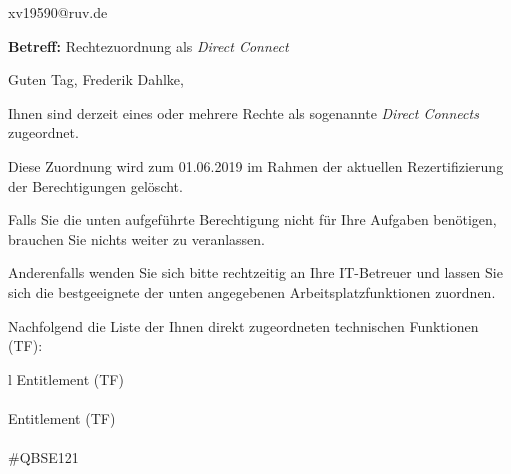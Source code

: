 \documentclass[a4paper,landscape,12pt]{letter}
\begin{document}
\begin{letter}{xv19590@ruv.de\hfill \break}
\begin{normalsize}
	\opening{\textbf{Betreff:} Rechtezuordnung als \emph{Direct Connect}}
	\begin{normalsize} \hfill
	\end{normalsize}

	\begin{normalsize}
		Guten Tag, 
	Frederik Dahlke, \hfill \break
	\end{normalsize}
	\end{normalsize}
	
\begin{normalsize}
	Ihnen sind derzeit eines oder mehrere Rechte als sogenannte \emph{Direct Connects} zugeordnet.
	
	Diese Zuordnung wird zum 01.06.2019 im Rahmen der aktuellen Rezertifizierung der Berechtigungen gelöscht.
	
	Falls Sie die unten aufgeführte Berechtigung nicht für Ihre Aufgaben benötigen, 
	brauchen Sie nichts weiter zu veranlassen.
	
	Anderenfalls wenden Sie sich bitte rechtzeitig an Ihre IT-Betreuer 
	und lassen Sie sich die bestgeeignete der unten angegebenen Arbeitsplatzfunktionen zuordnen.
	\end{normalsize}
	
\begin{normalsize}
	Nachfolgend die Liste der Ihnen direkt zugeordneten technischen Funktionen (TF):

	\begin{longtable}{l}
		Entitlement (TF) \\ \hline
		\endfirsthead
		\\\hline
		Entitlement (TF) \\ \hline
		\endhead %
		\multicolumn{1}{r@{}}{Fortsetzung \ldots}\\
		\endfoot
		\hline
		\endlastfoot
	\#QBSE121\\
	\end{longtable}
	\end{normalsize}
	

\end{letter}
\end{document}
